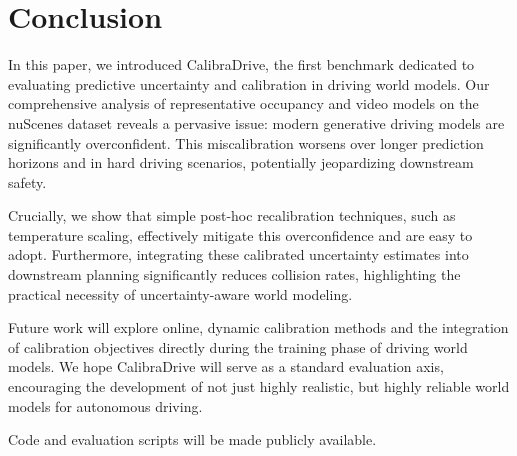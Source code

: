 \section{Conclusion}
\label{sec:conclusion}

In this paper, we introduced CalibraDrive, the first benchmark dedicated to evaluating predictive uncertainty and calibration in driving world models. Our comprehensive analysis of representative occupancy and video models on the nuScenes dataset reveals a pervasive issue: modern generative driving models are significantly overconfident. This miscalibration worsens over longer prediction horizons and in hard driving scenarios, potentially jeopardizing downstream safety.

Crucially, we show that simple post-hoc recalibration techniques, such as temperature scaling, effectively mitigate this overconfidence and are easy to adopt. Furthermore, integrating these calibrated uncertainty estimates into downstream planning significantly reduces collision rates, highlighting the practical necessity of uncertainty-aware world modeling.

Future work will explore online, dynamic calibration methods and the integration of calibration objectives directly during the training phase of driving world models. We hope CalibraDrive will serve as a standard evaluation axis, encouraging the development of not just highly realistic, but highly reliable world models for autonomous driving. 

Code and evaluation scripts will be made publicly available.
